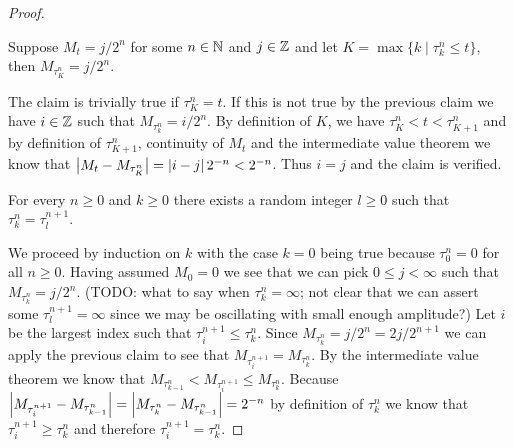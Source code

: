 \begin{proof}
\begin{clm}Suppose $M_t = j/2^n$ for some $n \in \mathbb{N}$ and $j \in \mathbb{Z}$ and let $K = \max \lbrace k \mid \tau^n_k \leq t \rbrace$, then $M_{\tau^n_K} = j/2^n$.
\end{clm}
The claim is trivially true if $\tau^n_K = t$.  If this is not true by the previous claim we have $i \in \mathbb{Z}$ such that $M_{\tau^n_k} = i/2^n$.  By definition of $K$, we have $\tau^n_K < t < \tau^n_{K+1}$ and by definition of $\tau^n_{K+1}$, continuity of $M_t$ and the intermediate value theorem we know that $\left \vert M_t - M_{\tau^n_K} \right \vert = \left \vert i-j \right \vert2^{-n}< 2^{-n}$.  Thus $i=j$ and the claim is verified.

\begin{clm}For every $n \geq 0$ and $k \geq 0$ there exists a random integer $l \geq 0$ such that $\tau^n_k = \tau^{n+1}_l$.
\end{clm}

We proceed by induction on $k$ with the case $k=0$ being true because $\tau^n_0 = 0$ for all $n \geq 0$.  Having assumed $M_0 = 0$ we see that we can pick $0 \leq j < \infty$ such that $M_{\tau^n_k} = j/2^n$. (TODO: what to say when $\tau^n_k = \infty$; not clear that we can assert some $\tau^{n+1}_l=\infty$ since we may be oscillating with small enough amplitude?)  Let $i$ be the largest index such that $\tau^{n+1}_i \leq \tau^n_k$.  Since $M_{\tau^n_k} = j/2^n = 2j/2^{n+1}$ we can apply the previous claim to see that $M_{\tau^{n+1}_i}  = M_{\tau^n_k}$.  By the intermediate value theorem we know that $M_{\tau^n_{k-1}} < M_{\tau^{n+1}_i}  \leq M_{\tau^n_k}$. Because $\left \vert M_{\tau^{n+1}_i} - M_{\tau^n_{k-1}} \right \vert = \left \vert M_{\tau^{n}_k} - M_{\tau^n_{k-1}} \right \vert = 2^{-n}$ by definition of $\tau^n_k$ we know that $\tau^{n+1}_i \geq \tau^n_k$ and therefore $\tau^{n+1}_i = \tau^n_k$.


\end{proof}
